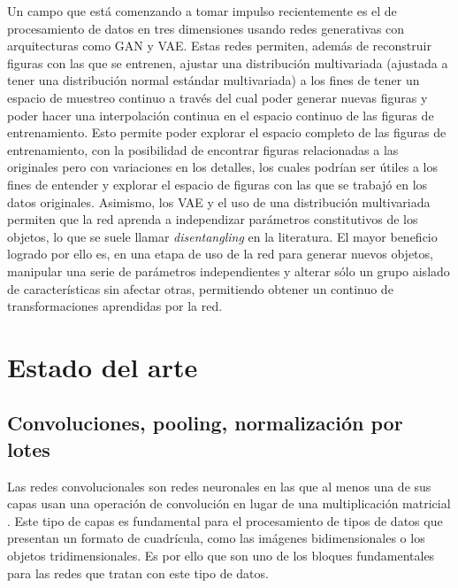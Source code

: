 \documentclass[spanish]{article}
\begin{document}
Un campo que está comenzando a tomar impulso recientemente es el de
procesamiento de datos en tres dimensiones usando redes generativas
con arquitecturas como GAN y VAE. Estas redes permiten, además de
reconstruir figuras con las que se entrenen, ajustar una distribución
multivariada (ajustada a tener una distribución normal estándar multivariada)
a los fines de tener un espacio de muestreo continuo a través del cual poder generar
nuevas figuras y poder hacer una interpolación continua en el espacio continuo de
las figuras de entrenamiento. Esto permite poder explorar el espacio completo de las
figuras de entrenamiento, con la posibilidad de encontrar figuras relacionadas a las
originales pero con variaciones en los detalles, los cuales podrían ser útiles a los
fines de entender y explorar el espacio de figuras con las que se trabajó en los
datos originales. Asimismo, los VAE y el uso de una distribución multivariada
permiten que la red aprenda a independizar parámetros constitutivos de los objetos,
lo que se suele llamar \textit{disentangling} en la literatura. El mayor beneficio
logrado por ello es, en una etapa de uso de la red para generar nuevos objetos,
manipular una serie de parámetros independientes y alterar sólo un grupo aislado
de características sin afectar otras, permitiendo obtener un continuo de
transformaciones aprendidas por la red.


\section{Estado del arte}

\subsection{Convoluciones, pooling, normalización por lotes}

Las redes convolucionales son redes neuronales en las que al menos una de sus capas
usan una operación de convolución en lugar de una multiplicación matricial
\cite{goodfellow2016deep}. Este tipo de capas es fundamental para el procesamiento
de tipos de datos que presentan un formato de cuadrícula, como las imágenes
bidimensionales o los objetos tridimensionales. Es por ello que son uno de los
bloques fundamentales para las redes que tratan con este tipo de datos.
\end{document}
